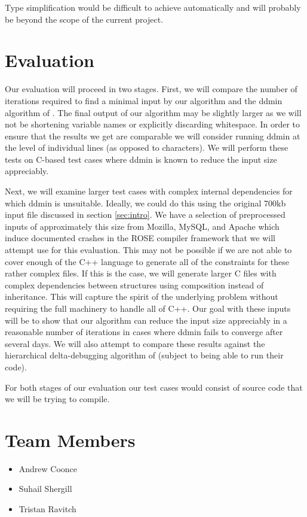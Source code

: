\documentclass[11pt]{article}
\begin{document}
Type simplification would be difficult to achieve automatically and will
probably be beyond the scope of the current project.

\section{Evaluation}
Our evaluation will proceed in two stages.  First, we will compare the number of
iterations required to find a minimal input by our algorithm and the ddmin
algorithm of \citeauthor{dd}.  The final output of our algorithm may be slightly
larger as we will not be shortening variable names or explicitly discarding
whitespace.  In order to ensure that the results we get are comparable we will
consider running ddmin at the level of individual lines (as opposed to
characters). We will perform these tests on C-based test cases where ddmin is
known to reduce the input size appreciably.

Next, we will examine larger test cases with complex internal dependencies for
which ddmin is unsuitable.  Ideally, we could do this using the original 700kb
input file discussed in section \ref{sec:intro}.  We have a selection of
preprocessed inputs of approximately this size from Mozilla, MySQL, and Apache
which induce documented crashes in the ROSE compiler framework \citep{rose} that
we will attempt use for this evaluation.  This may not be possible if we are not
able to cover enough of the C++ language to generate all of the constraints for
these rather complex files.  If this is the case, we will generate larger C
files with complex dependencies between structures using composition instead of
inheritance.  This will capture the spirit of the underlying problem without
requiring the full machinery to handle all of C++.  Our goal with these inputs
will be to show that our algorithm can reduce the input size appreciably in a
reasonable number of iterations in cases where ddmin fails to converge after
several days. We will also attempt to compare these results against the
hierarchical delta-debugging algorithm of \citeauthor{hdd} (subject to being
able to run their code).

For both stages of our evaluation our test cases would consist of source code
that we will be trying to compile.

\section{Team Members}
\begin{itemize}
\item{Andrew Coonce}
\item{Suhail Shergill}
\item{Tristan Ravitch}
\end{itemize}
\end{document}
